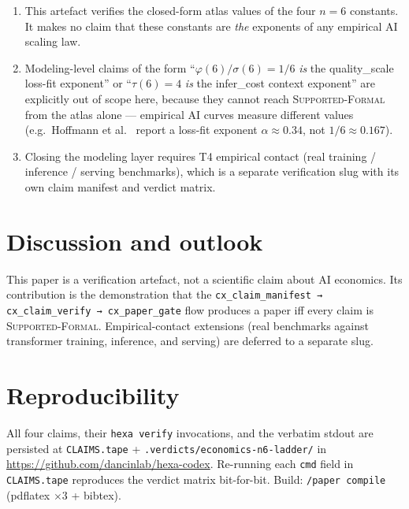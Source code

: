 \documentclass[11pt,a4paper]{article}
\begin{document}
\begin{enumerate}\itemsep0.3em
\item This artefact verifies the closed-form atlas values of the four
      $n=6$ constants. It makes no claim that these constants are
      \emph{the} exponents of any empirical AI scaling law.
\item Modeling-level claims of the form ``$\varphi(6)/\sigma(6) = 1/6$
      \emph{is} the quality\_scale loss-fit exponent'' or ``$\tau(6) =
      4$ \emph{is} the infer\_cost context exponent'' are explicitly
      out of scope here, because they cannot reach
      \textsc{Supported-Formal} from the atlas alone --- empirical AI
      curves measure different values (e.g.\ Hoffmann et al.\
      \cite{hoffmann2022chinchilla} report a loss-fit exponent
      $\alpha \approx 0.34$, not $1/6 \approx 0.167$).
\item Closing the modeling layer requires T4 empirical contact (real
      training / inference / serving benchmarks), which is a separate
      verification slug with its own claim manifest and verdict
      matrix.
\end{enumerate}

\section{Discussion and outlook}
\label{sec:discussion}

This paper is a verification artefact, not a scientific claim about AI
economics. Its contribution is the demonstration that the
\texttt{cx\_claim\_manifest → cx\_claim\_verify → cx\_paper\_gate}
flow produces a paper iff every claim is \textsc{Supported-Formal}.
Empirical-contact extensions (real benchmarks against transformer
training, inference, and serving) are deferred to a separate slug.

\section*{Reproducibility}

All four claims, their \texttt{hexa verify} invocations, and the
verbatim stdout are persisted at
\texttt{CLAIMS.tape} +
\texttt{.verdicts/economics-n6-ladder/} in
\url{https://github.com/dancinlab/hexa-codex}. Re-running each
\texttt{cmd} field in \texttt{CLAIMS.tape} reproduces the verdict
matrix bit-for-bit. Build: \texttt{/paper compile} (pdflatex
$\times 3$ + bibtex).



\end{document}
